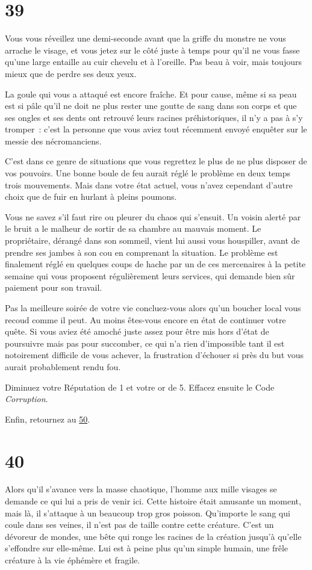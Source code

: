 \documentclass{report}
\newcommand{\gsection}[1]{
    \section{#1}
    \label{section-#1}
}
\newcommand{\glink}[1]{\hyperref[section-#1]{#1}}
\begin{document}
\gsection{39}

Vous vous réveillez une demi-seconde avant que la griffe du monstre ne vous arrache le visage, et vous jetez sur le côté juste à temps pour qu'il ne vous fasse qu'une large entaille au cuir chevelu et à l'oreille. Pas beau à voir, mais toujours mieux que de perdre ses deux yeux.

La goule qui vous a attaqué est encore fraîche. Et pour cause, même si sa peau est si pâle qu'il ne doit ne plus rester une goutte de sang dans son corps et que ses ongles et ses dents ont retrouvé leurs racines préhistoriques, il n'y a pas à s'y tromper :  c'est la personne que vous aviez tout récemment envoyé enquêter sur le messie des nécromanciens.

C'est dans ce genre de situations que vous regrettez le plus de ne plus disposer de vos pouvoirs. Une bonne boule de feu aurait réglé le problème en deux temps trois mouvements. Mais dans votre état actuel, vous n'avez cependant d'autre choix que de fuir en hurlant à pleins poumons.

Vous ne savez s'il faut rire ou pleurer du chaos qui s'ensuit. Un voisin alerté par le bruit a le malheur de sortir de sa chambre au mauvais moment. Le propriétaire, dérangé dans son sommeil, vient lui aussi vous houspiller, avant de prendre ses jambes à son cou en comprenant la situation. Le problème est finalement réglé en quelques coups de hache par un de ces mercenaires à la petite semaine qui vous proposent régulièrement leurs services, qui demande bien sûr paiement pour son travail.

Pas la meilleure soirée de votre vie concluez-vous alors qu'un boucher local vous recoud comme il peut. Au moins êtes-vous encore en état de continuer votre quête. Si vous aviez été amoché juste assez pour être mis hors d'état de poursuivre mais pas pour succomber, ce qui n'a rien d'impossible tant il est notoirement difficile de vous achever, la frustration d'échouer si près du but vous aurait probablement rendu fou.

Diminuez votre Réputation de 1 et votre or de 5. Effacez ensuite le Code \emph{Corruption}.

Enfin, retournez au \glink{50}.

\gsection{40}

Alors qu'il s'avance vers la masse chaotique, l'homme aux mille visages se demande ce qui lui a pris de venir ici. Cette histoire était amusante un moment, mais là, il s'attaque à un beaucoup trop gros poisson. Qu'importe le sang qui coule dans ses veines, il n'est pas de taille contre cette créature. C'est un dévoreur de mondes, une bête qui ronge les racines de la création jusqu'à qu'elle s'effondre sur elle-même. Lui est à peine plus qu'un simple humain, une frêle créature à la vie éphémère et fragile.
\end{document}
